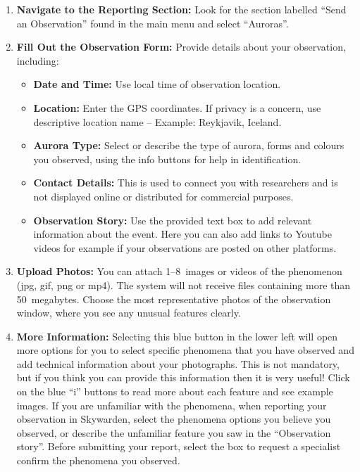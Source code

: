 \documentclass{article}
\begin{document}
\begin{enumerate}
    \item \textbf{Navigate to the Reporting Section:} Look for the section labelled ``Send an Observation'' found in the main menu and select ``Auroras''.
    
    \item \textbf{Fill Out the Observation Form:} Provide details about your observation, including:
    \begin{itemize}
        \item \textbf{Date and Time:} Use local time of observation location.
        \item \textbf{Location:} Enter the GPS coordinates. If privacy is a concern, use descriptive location name -- Example: Reykjavik, Iceland.
        \item \textbf{Aurora Type:} Select or describe the type of aurora, forms and colours you observed, using the info buttons for help in identification.
        \item \textbf{Contact Details:} This is used to connect you with researchers and is not displayed online or distributed for commercial purposes.
        \item \textbf{Observation Story:} Use the provided text box to add relevant information about the event. Here you can also add links to Youtube videos for example if your observations are posted on other platforms.
    \end{itemize}
    
    \item \textbf{Upload Photos:} You can attach 1--8~images or videos of the phenomenon (jpg, gif, png or mp4). The system will not receive files containing more than 50~megabytes. Choose the most representative photos of the observation window, where you see any unusual features clearly.

    \item \textbf{More Information:} Selecting this blue button in the lower left will open more options for you to select specific phenomena that you have observed and add technical information about your photographs. This is not mandatory, but if you think you can provide this information then it is very useful! Click on the blue ``i'' buttons to read more about each feature and see example images. If you are unfamiliar with the phenomena, when reporting your observation in Skywarden, select the phenomena options you believe you observed, or describe the unfamiliar feature you saw in the ``Observation story''. Before submitting your report, select the box to request a specialist confirm the phenomena you observed.
    

\end{enumerate}
\end{document}
